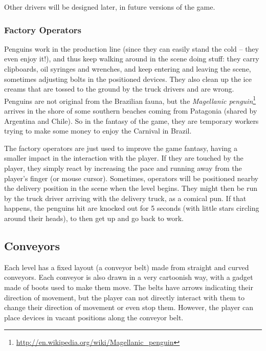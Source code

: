 \documentclass[a4paper]{scrartcl}
\begin{document}
            Other drivers will be designed later, in future versions of the game.

        \subsubsection{Factory Operators}
            Penguins work in the production line (since they can easily stand
            the cold -- they even enjoy it!), and thus keep walking around in
            the scene doing stuff: they carry clipboards, oil syringes and
            wrenches, and keep entering and leaving the scene, sometimes
            adjusting bolts in the positioned devices. They also clean up the
            ice creams that are tossed to the ground by the truck drivers and
            are wrong. Penguins are not original from the Brazilian fauna, but
            the \textit{Magellanic penguin}\footnote{\url{http://en.wikipedia.org/wiki/Magellanic_penguin}}
            arrives in the shore of some southern beaches coming from Patagonia
            (shared by Argentina and Chile). So in the fantasy of the game, they
            are temporary workers trying to make some money to enjoy the
            Carnival in Brazil.

            The factory operators are just used to improve the game fantasy,
            having a smaller impact in the interaction with the player. If they
            are touched by the player, they simply react by increasing the pace
            and running away from the player's finger (or mouse cursor).
            Sometimes, operators will be positioned nearby the delivery position
            in the scene when the level begins. They might then be run by the
            truck driver arriving with the delivery truck, as a comical pun. If
            that happens, the penguins hit are knocked out for 5 seconds (with
            little stars circling around their heads), to then get up and go
            back to work.

    \subsection{Conveyors}
        Each level has a fixed layout (a conveyor belt) made from straight and
        curved conveyors. Each conveyor is also drawn in a very cartoonish way,
        with a gadget made of boots used to make them move. The belts have
        arrows indicating their direction of movement, but the player can not
        directly interact with them to change their direction of movement or
        even stop them. However, the player can place devices in vacant
        positions along the conveyor belt.
\end{document}
